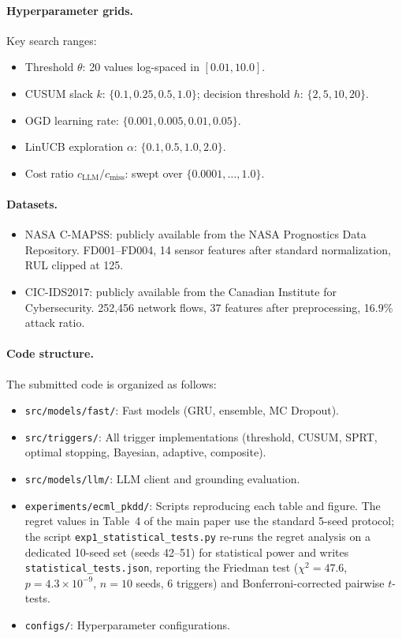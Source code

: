 \paragraph{Hyperparameter grids.}
Key search ranges:
\begin{itemize}
\item Threshold $\theta$: 20 values log-spaced in $[0.01, 10.0]$.
\item CUSUM slack $k$: $\{0.1, 0.25, 0.5, 1.0\}$; decision threshold $h$: $\{2, 5, 10, 20\}$.
\item OGD learning rate: $\{0.001, 0.005, 0.01, 0.05\}$.
\item LinUCB exploration $\alpha$: $\{0.1, 0.5, 1.0, 2.0\}$.
\item Cost ratio $c_\text{LLM}/c_\text{miss}$: swept over $\{0.0001, \ldots, 1.0\}$.
\end{itemize}

\paragraph{Datasets.}
\begin{itemize}
\item NASA C-MAPSS: publicly available from the NASA Prognostics Data Repository. FD001--FD004, 14 sensor features after standard normalization, RUL clipped at 125.
\item CIC-IDS2017: publicly available from the Canadian Institute for Cybersecurity. 252{,}456 network flows, 37 features after preprocessing, 16.9\% attack ratio.
\end{itemize}

\paragraph{Code structure.}
The submitted code is organized as follows:
\begin{itemize}
\item \texttt{src/models/fast/}: Fast models (GRU, ensemble, MC Dropout).
\item \texttt{src/triggers/}: All trigger implementations (threshold, CUSUM, SPRT, optimal stopping, Bayesian, adaptive, composite).
\item \texttt{src/models/llm/}: LLM client and grounding evaluation.
\item \texttt{experiments/ecml\_pkdd/}: Scripts reproducing each table and figure. The regret values in Table~4 of the main paper use the standard 5-seed protocol; the script \texttt{exp1\_\allowbreak statistical\_\allowbreak tests.py} re-runs the regret analysis on a dedicated 10-seed set (seeds 42--51) for statistical power and writes \texttt{statistical\_\allowbreak tests.json}, reporting the Friedman test ($\chi^2{=}47.6$, $p{=}4.3{\times}10^{-9}$, $n{=}10$ seeds, 6 triggers) and Bonferroni-corrected pairwise $t$-tests.
\item \texttt{configs/}: Hyperparameter configurations.
\end{itemize}

